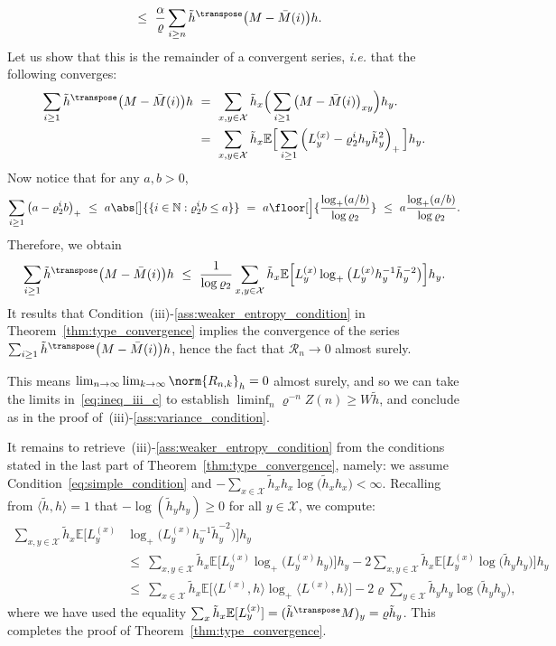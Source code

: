 \begin{refsegment}
\begin{align}
  &\leq\  \frac{\alpha}{\varrho}\sum_{i\geq n} \tilde{h}^\transpose\big(M-\bar{M}(i)\big)h. \label{eq:rest_cv_series}
\end{align}
Let us show that this is the remainder of a convergent series, \textit{i.e.} that the following converges:
\begin{align*}
  \sum_{i\geq 1} \tilde{h}^\transpose\big(M-\bar{M}(i)\big)h\ &=\ \sum_{x,y\in \mathcal{X}}\tilde{h}_x \Big( \sum_{i\geq 1} \big(M-\bar{M}(i)\big)_{xy} \Big) h_y. \\
  &=\ \sum_{x,y\in \mathcal{X}}\tilde{h}_x\mathbb{E}\Big[ \sum_{i\geq 1} \left( L^{(x)}_y - \varrho_2^i h_y\tilde{h}_y^2 \right)_+\Big]h_y. 
\end{align*}
%
Now notice that for any $a,b>0$,
\[
\sum_{i\geq 1}\left(a - \varrho_2^i b \right)_+ \ \leq\ a \abs[\big]{\{i \in \mathbb{N} : \varrho_2^ib \leq a\}}\ =\ a\floor[\Big]{\frac{\log_+(a/b)}{\log \varrho_2}} \ \leq\ a\frac{\log_+(a/b)}{\log \varrho_2}.
\]
Therefore, we obtain
\[
  \sum_{i\geq 1} \tilde{h}^\transpose \big(M-\bar{M}(i)\big)h \ \leq\ \frac{1}{\log \varrho_2} \sum_{x,y\in \mathcal{X}} \tilde{h}_x \mathbb{E}\Big[L^{(x)}_y\log_+\big( L^{(x)}_y h_y^{-1}\tilde{h}_y^{-2} \big) \Big] h_y.
\]
It results that Condition~(iii)-\ref{ass:weaker_entropy_condition} in Theorem~\ref{thm:type_convergence} implies the convergence of the series $\sum_{i\geq 1} \tilde{h}^\transpose \big(M-\bar{M}(i)\big)h$, hence the fact that $\mathcal{R}_n\to 0$ almost surely.

This means $\lim_{n\to\infty}\lim_{k\to \infty}\norm{R_{n,k}}_h = 0$ almost surely, and so we can take the limits in~\eqref{eq:ineq_iii_c} to establish $\liminf_n \varrho^{-n}Z(n) \geq W\tilde{h}$, and conclude as in the proof of~(iii)-\ref{ass:variance_condition}.

It remains to retrieve~(iii)-\ref{ass:weaker_entropy_condition} from the conditions stated in the last part of Theorem~\ref{thm:type_convergence}, namely: we assume Condition~\eqref{eq:simple_condition} and $-\sum_{x\in \mathcal{X}} \tilde{h}_xh_x \log\big( \tilde{h}_xh_x\big) < \infty$.
Recalling from $\langle \tilde{h}, h\rangle =1$ that $-\log(\tilde{h}_yh_y) \geq 0$ for all $y\in \mathcal{X}$, we compute:
\begin{align*}
\sum_{x,y\in \mathcal{X}} \tilde{h}_x \mathbb{E}\Big[L^{(x)}_y&\log_+\big( L^{(x)}_y h_y^{-1}\tilde{h}_y^{-2} \big) \Big] h_y \\
&\leq\ 
\sum_{x,y\in \mathcal{X
}} \tilde{h}_x \mathbb{E}\Big[L^{(x)}_y\log_+\big( L^{(x)}_yh_y \big) \Big] h_y
-2 \sum_{x,y\in \mathcal{X}} \tilde{h}_x \mathbb{E}\Big[L^{(x)}_y \log\big( \tilde{h}_yh_y \big) \Big] h_y \\
&\leq\ 
\sum_{x\in \mathcal{X}} \tilde{h}_x \mathbb{E}\Big[\big\langle L^{(x)},h\big\rangle\log_+\big\langle L^{(x)},h\big\rangle \Big]
- 2 \varrho \sum_{y\in \mathcal{X}} \tilde{h}_yh_y \log\big( \tilde{h}_yh_y\big),
\end{align*}
where we have used the equality $\sum_x \tilde{h}_x \mathbb{E}[L^{(x)}_y] = (\tilde{h}^\transpose M)_y = \varrho \tilde{h}_y$.
This completes the proof of Theorem~\ref{thm:type_convergence}.



\end{refsegment}
